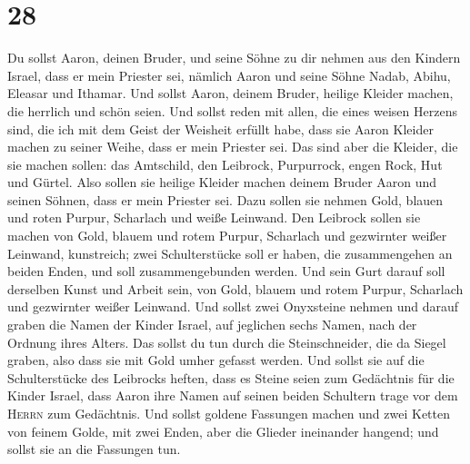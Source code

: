 \hypertarget{section-27}{%
\section{28}\label{section-27}}

 Du sollst Aaron, deinen Bruder, und seine Söhne zu dir
nehmen aus den Kindern Israel, dass er mein Priester sei, nämlich Aaron
und seine Söhne Nadab, Abihu, Eleasar und Ithamar.  Und
sollst Aaron, deinem Bruder, heilige Kleider machen, die herrlich und
schön seien.  Und sollst reden mit allen, die eines weisen
Herzens sind, die ich mit dem Geist der Weisheit erfüllt habe, dass sie
Aaron Kleider machen zu seiner Weihe, dass er mein Priester sei.
 Das sind aber die Kleider, die sie machen sollen: das
Amtschild, den Leibrock, Purpurrock, engen Rock, Hut und Gürtel. Also
sollen sie heilige Kleider machen deinem Bruder Aaron und seinen Söhnen,
dass er mein Priester sei.  Dazu sollen sie nehmen Gold,
blauen und roten Purpur, Scharlach und weiße Leinwand. 
Den Leibrock sollen sie machen von Gold, blauem und rotem Purpur,
Scharlach und gezwirnter weißer Leinwand, kunstreich; 
zwei Schulterstücke soll er haben, die zusammengehen an beiden Enden,
und soll zusammengebunden werden.  Und sein Gurt darauf
soll derselben Kunst und Arbeit sein, von Gold, blauem und rotem Purpur,
Scharlach und gezwirnter weißer Leinwand.  Und sollst zwei
Onyxsteine nehmen und darauf graben die Namen der Kinder Israel,
 auf jeglichen sechs Namen, nach der Ordnung ihres
Alters.  Das sollst du tun durch die Steinschneider, die
da Siegel graben, also dass sie mit Gold umher gefasst werden.
 Und sollst sie auf die Schulterstücke des Leibrocks
heften, dass es Steine seien zum Gedächtnis für die Kinder Israel, dass
Aaron ihre Namen auf seinen beiden Schultern trage vor dem
\textsc{Herrn} zum Gedächtnis.  Und sollst goldene
Fassungen machen  und zwei Ketten von feinem Golde, mit
zwei Enden, aber die Glieder ineinander hangend; und sollst sie an die
Fassungen tun.

